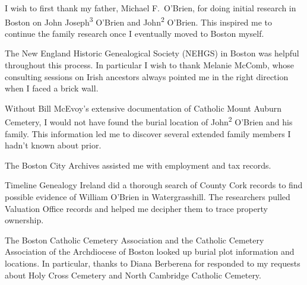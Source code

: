 I wish to first thank my father, Michael F.\ O'Brien, for doing initial research in Boston on John Joseph\textsuperscript{3} O'Brien and John\textsuperscript{2} O'Brien. This inspired me to continue the family research once I eventually moved to Boston myself.

The New England Historic Genealogical Society (NEHGS) in Boston was helpful throughout this process. In particular I wish to thank Melanie McComb, whose consulting sessions on Irish ancestors always pointed me in the right direction when I faced a brick wall.

Without Bill McEvoy's extensive documentation of Catholic Mount Auburn Cemetery, I would not have found the burial location of John\textsuperscript{2} O'Brien and his family. This information led me to discover several extended family members I hadn't known about prior.

The Boston City Archives assisted me with employment and tax records.

Timeline Genealogy Ireland did a thorough search of County Cork records to find possible evidence of William O'Brien in Watergrasshill. The researchers pulled Valuation Office records and helped me decipher them to trace property ownership.

The Boston Catholic Cemetery Association and the Catholic Cemetery Association of the Archdiocese of Boston looked up burial plot information and locations. In particular, thanks to Diana Berberena for responded to my requests about Holy Cross Cemetery and North Cambridge Catholic Cemetery.


